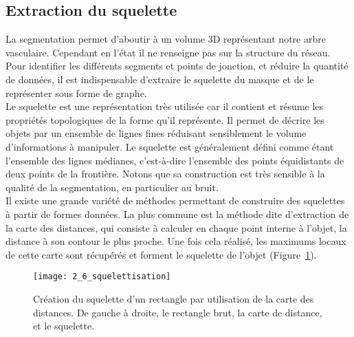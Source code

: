 \subsection{Extraction du squelette}	
La segmentation permet d’aboutir à un volume 3D représentant notre arbre vasculaire. Cependant en l’état il ne renseigne pas sur la structure du réseau. Pour identifier les différents segments et points de jonction, et réduire la quantité de données, il est indispensable d’extraire le squelette du masque et de le représenter sous forme de graphe. \\
Le squelette est une représentation très utilisée car il contient et résume les propriétés topologiques de la forme qu’il représente. Il permet  de décrire les objets par un ensemble de lignes fines réduisant sensiblement le volume d’informations à manipuler. Le squelette est généralement défini comme étant l’ensemble des lignes médianes, c’est-à-dire l’ensemble des points équidistants de deux points de la frontière. Notons que sa construction est très sensible à la qualité de la segmentation, en particulier au bruit.  \\
Il existe une grande variété de méthodes permettant de construire des squelettes à partir de formes données. La plus commune est la méthode dite d’extraction de la carte des distances, qui consiste à calculer en chaque point interne à l’objet, la distance à son contour le plus proche. Une fois cela réalisé, les maximums locaux de cette carte sont récupérés et forment le squelette de l’objet (Figure~\ref{fig:2_6_squelettisation}). 
\begin{figure}[!b]
\centering
\texttt{[image: 2\_6\_squelettisation]}
\caption{Création du squelette d'un rectangle par utilisation de la carte des distances. De gauche à droite, le rectangle brut, la carte de distance, et le squelette.}
\label{fig:2_6_squelettisation}	
\end{figure}	


